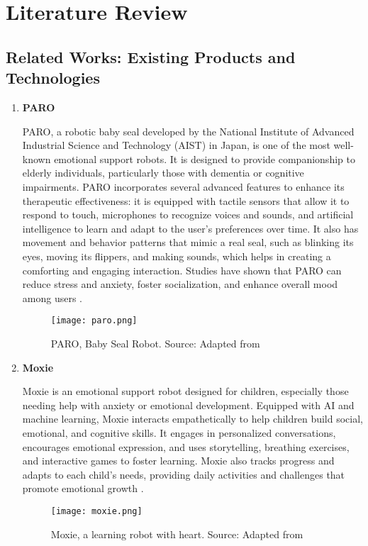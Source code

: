 \section{Literature Review}

\subsection{Related Works: Existing Products and Technologies}

\begin{enumerate}


\item{\bf{PARO}}
\vspace{0.25cm}

PARO, a robotic baby seal developed by the National Institute of Advanced Industrial Science and Technology (AIST) in Japan, is one of the most well-known emotional support robots. It is designed to provide companionship to elderly individuals, particularly those with dementia or cognitive impairments. PARO incorporates several advanced features to enhance its therapeutic effectiveness: it is equipped with tactile sensors that allow it to respond to touch, microphones to recognize voices and sounds, and artificial intelligence to learn and adapt to the user’s preferences over time. It also has movement and behavior patterns that mimic a real seal, such as blinking its eyes, moving its flippers, and making sounds, which helps in creating a comforting and engaging interaction. Studies have shown that PARO can reduce stress and anxiety, foster socialization, and enhance overall mood among users \cite{1642310}.


\begin{figure}[ht]
    \centering
    \texttt{[image: paro.png]}
    \caption{PARO, Baby Seal Robot. Source: Adapted from \cite{1642310}}
    \label{fig:paro}
\end{figure}

\item{\bf{Moxie}}
\vspace{0.25cm}

Moxie is an emotional support robot designed for children, especially those needing help with anxiety or emotional development. Equipped with AI and machine learning, Moxie interacts empathetically to help children build social, emotional, and cognitive skills. It engages in personalized conversations, encourages emotional expression, and uses storytelling, breathing exercises, and interactive games to foster learning. Moxie also tracks progress and adapts to each child’s needs, providing daily activities and challenges that promote emotional growth \cite{hurst2020socialemotionalskillstraining}.

\begin{figure}[ht]
    \centering
    \texttt{[image: moxie.png]}
    \caption{Moxie, a learning robot with heart. Source: Adapted from \cite{hurst2020socialemotionalskillstraining}}
    \label{fig:moxie}
\end{figure}

\end{enumerate}
\newpage
